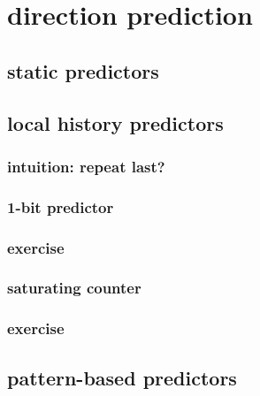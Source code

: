 \section{direction prediction}


\subsection{static predictors}


\subsection{local history predictors}


\subsubsection{intuition: repeat last?}


\subsubsection{1-bit predictor}


\subsubsection{exercise}



\subsubsection{saturating counter}


\subsubsection{exercise}




\subsection{pattern-based predictors}
